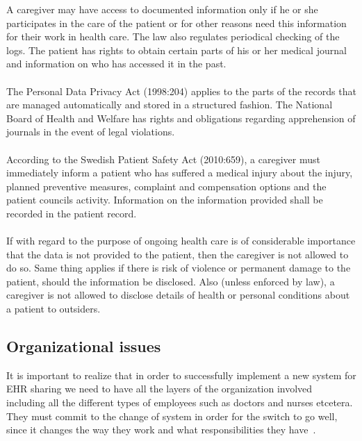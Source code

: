 \documentclass[14pt]{article}
\begin{document}
A caregiver may have access to documented information only if he or she participates in the care of the patient or for other reasons need this information for their work in health care. The law also regulates periodical checking of the logs. The patient has rights to obtain certain parts of his or her medical journal and information on who has accessed it in the past.\cite{PatientDataAct}
\\\\
The Personal Data Privacy Act (1998:204) applies to the parts of the records that are managed automatically and stored in a structured fashion. The National Board of Health and Welfare has rights and obligations regarding apprehension of journals in the event of legal violations.\cite{PatientDataAct}
\\\\
According to the Swedish Patient Safety Act (2010:659), a caregiver must immediately inform a patient who has suffered a medical injury
about the injury, planned preventive measures, complaint and compensation
options and the patient councils activity. Information on the information provided shall be recorded in the patient record.\cite{PatientSafetyAct}
\\\\
If with regard to the purpose of ongoing health care is of considerable importance
that the data is not provided to the patient, then the caregiver is not allowed to
do so. Same thing applies if there is risk of violence or permanent damage to the
patient, should the information be disclosed. Also (unless enforced by law), a caregiver is not allowed to disclose details of health or personal conditions about a patient to outsiders.\cite{PatientSafetyAct}

\subsection{Organizational issues}
It is important to realize that in order to successfully implement a new system for \gls{EHR} sharing we need to have all the layers of the organization involved~\cite{Empirica} including all the different types of employees such as doctors and nurses etcetera. They must commit to the change of system in order for the switch to go well, since it changes the way they work and what responsibilities they have~\cite{Empirica}.
\end{document}
